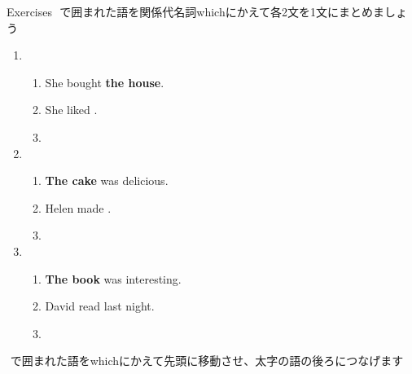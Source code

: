 \documentclass[aspectratio=169,xcolor={dvipsnames,table}]{beamer}
\begin{document}
\begin{frame}[plain]{Exercises}
\fbox{　　}\,\,で囲まれた語を関係代名詞whichにかえて各2文を1文にまとめましょう
\begin{enumerate}
 \item \begin{enumerate}
	\item She bought {\bfseries the house}.
	\item She liked .
	\item {}
       \end{enumerate} \item \begin{enumerate}
	\item {\bfseries The cake} was delicious.
	\item Helen made .
	\item {}
       \end{enumerate}

 \item \begin{enumerate}
	\item {\bfseries The book} was interesting.
	\item David read  last night.
	\item {}
       \end{enumerate}
\end{enumerate} 

\hfill\fbox{　　}\,\,で囲まれた語をwhichにかえて先頭に移動させ、太字の語の後ろにつなげます
\end{frame}
\end{document}
